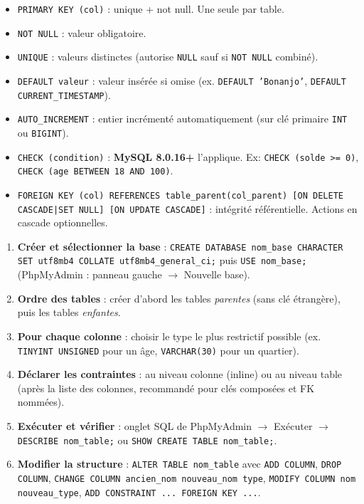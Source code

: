 \documentclass[11pt]{article}
\begin{document}
\begin{propriete}
\begin{itemize}
\item \texttt{PRIMARY KEY (col)} : unique + not null. Une seule par table.
\item \texttt{NOT NULL} : valeur obligatoire.
\item \texttt{UNIQUE} : valeurs distinctes (autorise \texttt{NULL} sauf si \texttt{NOT NULL} combiné).
\item \texttt{DEFAULT valeur} : valeur insérée si omise (ex. \texttt{DEFAULT 'Bonanjo'}, \texttt{DEFAULT CURRENT\_TIMESTAMP}).
\item \texttt{AUTO\_INCREMENT} : entier incrémenté automatiquement (sur clé primaire \texttt{INT} ou \texttt{BIGINT}).
\item \texttt{CHECK (condition)} : \textbf{MySQL 8.0.16+} l'applique. Ex: \texttt{CHECK (solde >= 0)}, \texttt{CHECK (age BETWEEN 18 AND 100)}.
\item \texttt{FOREIGN KEY (col) REFERENCES table\_parent(col\_parent) [ON DELETE CASCADE|SET NULL] [ON UPDATE CASCADE]} : intégrité référentielle. Actions en cascade optionnelles.
\end{itemize}
\end{propriete}

\begin{methode}
\begin{enumerate}
\item \textbf{Créer et sélectionner la base} : \texttt{CREATE DATABASE nom\_base CHARACTER SET utf8mb4 COLLATE utf8mb4\_general\_ci;} puis \texttt{USE nom\_base;} (PhpMyAdmin : panneau gauche $\to$ Nouvelle base).
\item \textbf{Ordre des tables} : créer d'abord les tables \emph{parentes} (sans clé étrangère), puis les tables \emph{enfantes}.
\item \textbf{Pour chaque colonne} : choisir le type le plus restrictif possible (ex. \texttt{TINYINT UNSIGNED} pour un âge, \texttt{VARCHAR(30)} pour un quartier).
\item \textbf{Déclarer les contraintes} : au niveau colonne (inline) ou au niveau table (après la liste des colonnes, recommandé pour clés composées et FK nommées).
\item \textbf{Exécuter et vérifier} : onglet SQL de PhpMyAdmin $\to$ Exécuter $\to$ \texttt{DESCRIBE nom\_table;} ou \texttt{SHOW CREATE TABLE nom\_table;}.
\item \textbf{Modifier la structure} : \texttt{ALTER TABLE nom\_table} avec \texttt{ADD COLUMN}, \texttt{DROP COLUMN}, \texttt{CHANGE COLUMN ancien\_nom nouveau\_nom type}, \texttt{MODIFY COLUMN nom nouveau\_type}, \texttt{ADD CONSTRAINT ... FOREIGN KEY ...}.
\end{enumerate}
\end{methode}
\end{document}
